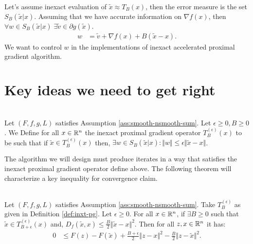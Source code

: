 \documentclass[12pt]{article}
\begin{document}
    Let's assume inexact evaluation of $\tilde x \approx T_B(x)$, then the error measure is the set $S_B(\tilde x | x)$. 
    Assuming that we have accurate information on $\nabla f(x)$, then $\forall w \in S_B(\tilde x | x)\;\exists \tilde v \in \partial g(\tilde x)$. 
    \begin{align*}
        w &= \tilde v + \nabla f(x) + B(\tilde x - x). 
    \end{align*}
    We want to control $w$ in the implementations of inexact accelerated proximal gradient algorithm.
    
\section{Key ideas we need to get right}
    \begin{definition}\;\label{def:inxt-pg}\\
        Let $(F, f, g, L)$ satisfies Assumption \ref{ass:smooth-nsmooth-sum}.
        Let $\epsilon \ge 0, B \ge 0$. 
        We Define for all $x \in \mathbb R^n$ the inexact proximal gradient operator $T_B^{(\epsilon)}(x)$ to be such that if $\tilde x \in T^{(\epsilon)}_{B}(x)$ then, $\exists w \in S_{B}(\tilde x | x):\Vert w\Vert\le \epsilon \Vert \tilde x - x\Vert$.         
    \end{definition}
    The algorithm we will design must produce iterates in a way that satisfies the inexact proximal gradient operator define above. 
    The following theorem will characterize a key inequality for convergence claim. 
    \begin{theorem}\;\label{thm:inxt-pg-ineq}\\
        Let $(F, f, g, L)$ satisfies Assumption \ref{ass:smooth-nsmooth-sum}.
        Take $T^{(\epsilon)}_B$ as given in Definition \ref{def:inxt-pg}. 
        Let $\epsilon \ge 0$. 
        For all $x\in \mathbb R^n$, if $\exists B \ge 0$ such that $\tilde x \in T_{B + \epsilon}^{(\epsilon)}(x)$ and, $D_f(\tilde x, x)\le \frac{B}{2}\Vert \tilde x - x\Vert^2$. 
        Then for all $z, x \in \mathbb R^n$ it has: 
        \begin{align*}
            0 &\le F(z) - F(\tilde x) + \frac{B + \epsilon}{2}\Vert z - x\Vert^2
            - \frac{B}{2}\Vert z - \tilde x\Vert^2. 
        \end{align*}
    \end{theorem}
\end{document}
